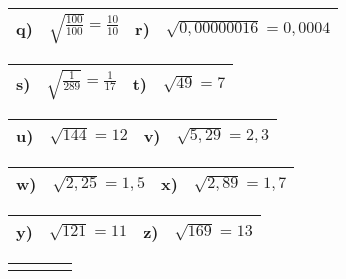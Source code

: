 \documentclass[12pt]{article}
\begin{document}
\vspace{0.5cm}
\begin{tabularx}{\textwidth}{|C{1.0cm}|X|C{1.0cm}|X|}
\hline
q)&{$\sqrt{\frac{100}{100}}=\frac{10}{10}$}
&
r)&{$\sqrt{0,00000016}=0,0004$}
\\\hline
\end{tabularx}
\vspace{0.5cm}
\begin{tabularx}{\textwidth}{|C{1.0cm}|X|C{1.0cm}|X|}
\hline
s)&{$\sqrt{\frac{1}{289}}=\frac{1}{17}$}
&
t)&{$\sqrt{49}=7$}
\\\hline
\end{tabularx}
\vspace{0.5cm}
\begin{tabularx}{\textwidth}{|C{1.0cm}|X|C{1.0cm}|X|}
\hline
u)&{$\sqrt{144}=12$}
&
v)&{$\sqrt{5,29}=2,3$}
\\\hline
\end{tabularx}
\vspace{0.5cm}
\begin{tabularx}{\textwidth}{|C{1.0cm}|X|C{1.0cm}|X|}
\hline
w)&{$\sqrt{2,25}=1,5$}
&
x)&{$\sqrt{2,89}=1,7$}
\\\hline
\end{tabularx}
\vspace{0.5cm}
\begin{tabularx}{\textwidth}{|C{1.0cm}|X|C{1.0cm}|X|}
\hline
y)&{$\sqrt{121}=11$}
&
z)&{$\sqrt{169}=13$}
\\\hline
\end{tabularx}
\vspace{0.5cm}
\begin{tabularx}{\textwidth}{|C{1.0cm}|X|C{1.0cm}|X|}
\hline
\end{tabularx}
\vspace{0.5cm}
\end{document}
